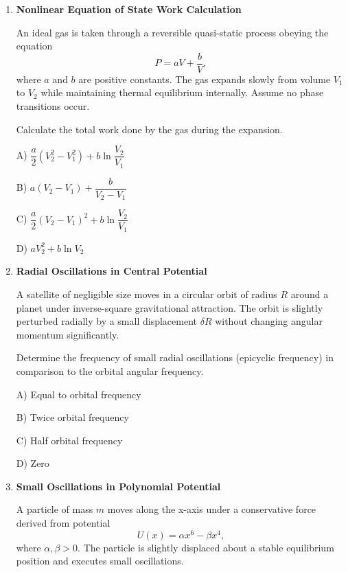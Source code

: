\documentclass[12pt]{article}
\begin{document}
\begin{enumerate}
\begin{center}
\end{center}

A) $\sqrt{\dfrac{3g}{L}}$

B) $\sqrt{\dfrac{3g}{L}-\dfrac{3B^2L^2}{2mR}}$

C) $\sqrt{\dfrac{6g}{L}}$

D) $\sqrt{\dfrac{3g}{L}-\dfrac{B^2L^2}{mR}}$

\item \textbf{Nonlinear Equation of State Work Calculation}

An ideal gas is taken through a reversible quasi-static process obeying the equation  
\[
P = aV + \frac{b}{V},
\]
where $a$ and $b$ are positive constants. The gas expands slowly from volume $V_1$ to $V_2$ while maintaining thermal equilibrium internally. Assume no phase transitions occur.

Calculate the total work done by the gas during the expansion.

A) $\dfrac{a}{2}(V_2^2-V_1^2)+b\ln\dfrac{V_2}{V_1}$

B) $a(V_2-V_1)+\dfrac{b}{V_2-V_1}$

C) $\dfrac{a}{2}(V_2-V_1)^2+b\ln\dfrac{V_2}{V_1}$

D) $aV_2^2+b\ln V_2$

\item \textbf{Radial Oscillations in Central Potential}

A satellite of negligible size moves in a circular orbit of radius $R$ around a planet under inverse-square gravitational attraction. The orbit is slightly perturbed radially by a small displacement $\delta R$ without changing angular momentum significantly.

Determine the frequency of small radial oscillations (epicyclic frequency) in comparison to the orbital angular frequency.

A) Equal to orbital frequency  

B) Twice orbital frequency  

C) Half orbital frequency  

D) Zero  

\item \textbf{Small Oscillations in Polynomial Potential}

A particle of mass $m$ moves along the x-axis under a conservative force derived from potential  
\[
U(x) = \alpha x^6 - \beta x^4,
\]
where $\alpha, \beta > 0$. The particle is slightly displaced about a stable equilibrium position and executes small oscillations.


\end{enumerate}
\end{document}
